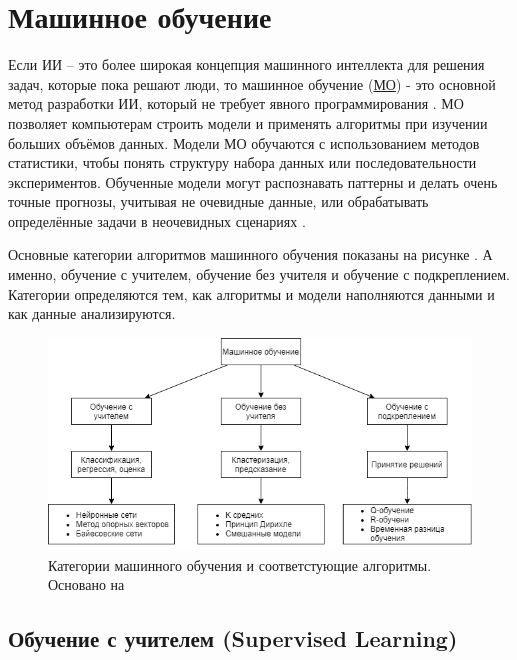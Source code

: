 \section{Машинное обучение} \label{ch1:ml}

Если ИИ – это более широкая концепция машинного интеллекта для решения задач, которые пока решают люди, то машинное обучение (\hyperref[acr:ml]{МО}) - это основной метод разработки ИИ, который не требует явного программирования \cite{Samuel-SomeStudies}. МО позволяет компьютерам строить модели и применять алгоритмы при изучении больших объёмов данных. Модели МО обучаются с использованием методов статистики, чтобы понять структуру набора данных или последовательности экспериментов. Обученные модели могут распознавать паттерны и делать очень точные прогнозы, учитывая не очевидные данные, или обрабатывать определённые задачи в неочевидных сценариях \cite{bishop06pattern}.

Основные категории алгоритмов машинного обучения показаны на рисунке . А именно, обучение с учителем, обучение без учителя и обучение с подкреплением.
Категории определяются тем, как алгоритмы и модели наполняются данными и как данные анализируются.

\begin{figure}[ht!] 
	\center
	\includegraphics [scale=0.60] {my_folder/images/ch1/ML-categories.png}
	\caption{Категории машинного обучения и соответстующие алгоритмы. Основано на \cite{Sultan_2018}}
	\label{fig:ch1-ML-categories}
\end{figure}

\subsection{Обучение с учителем (Supervised Learning)}

